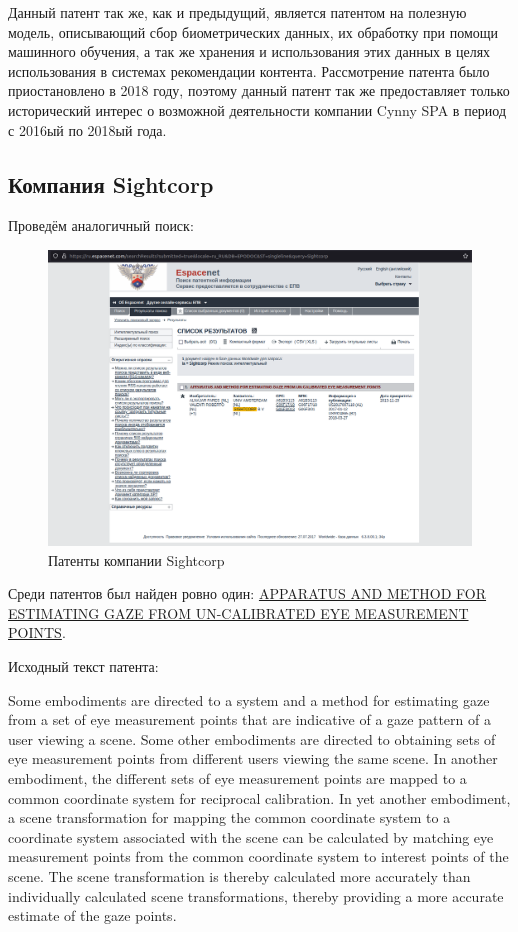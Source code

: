 \documentclass[12pt]{article}
\begin{document}
    Данный патент так же, как и предыдущий, является патентом на полезную модель, описывающий сбор биометрических данных, их обработку при помощи машинного обучения, а так же хранения и использования этих данных в целях использования в системах рекомендации контента.
    Рассмотрение патента было приостановлено в 2018 году, поэтому данный патент так же предоставляет только исторический интерес о возможной деятельности компании Cynny SPA в период с 2016ый по 2018ый года.

    \subsection{Компания Sightcorp}

    Проведём аналогичный поиск:

    \begin{figure}[ht]
        \centering
        \includegraphics[scale=1.5]{images/5.png}
        \caption{Патенты компании Sightcorp}
        \label{fig:o:5}
    \end{figure}

    Среди патентов был найден ровно один: \href{https://ru.espacenet.com/publicationDetails/biblio?DB=EPODOC&II=0&ND=3&adjacent=true&locale=ru_RU&FT=D&date=20170112&CC=US&NR=2017007118A1&KC=A1#}{APPARATUS AND METHOD FOR ESTIMATING GAZE FROM UN-CALIBRATED EYE MEASUREMENT POINTS}.

    Исходный текст патента:

    Some embodiments are directed to a system and a method for estimating gaze from a set of eye measurement points that are indicative of a gaze pattern of a user viewing a scene.
    Some other embodiments are directed to obtaining sets of eye measurement points from different users viewing the same scene.
    In another embodiment, the different sets of eye measurement points are mapped to a common coordinate system for reciprocal calibration.
    In yet another embodiment, a scene transformation for mapping the common coordinate system to a coordinate system associated with the scene can be calculated by matching eye measurement points from the common coordinate system to interest points of the scene.
    The scene transformation is thereby calculated more accurately than individually calculated scene transformations, thereby providing a more accurate estimate of the gaze points.
\end{document}
